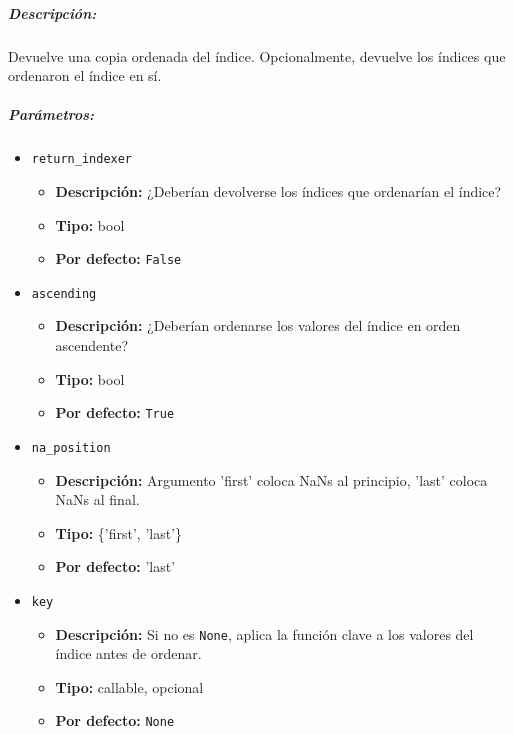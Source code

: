 \subparagraph{Descripción:}
Devuelve una copia ordenada del índice. Opcionalmente, devuelve los índices que
ordenaron el índice en sí.

\subparagraph{Parámetros:}

\begin{itemize}
    \item \texttt{return\_indexer}
          \begin{itemize}
              \item \textbf{Descripción:} ¿Deberían devolverse los índices que
                    ordenarían el índice?
              \item \textbf{Tipo:} bool
              \item \textbf{Por defecto:} \texttt{False}
          \end{itemize}
    \item \texttt{ascending}
          \begin{itemize}
              \item \textbf{Descripción:} ¿Deberían ordenarse los valores del
                    índice en orden ascendente?
              \item \textbf{Tipo:} bool
              \item \textbf{Por defecto:} \texttt{True}
          \end{itemize}
    \item \texttt{na\_position}
          \begin{itemize}
              \item \textbf{Descripción:} Argumento 'first' coloca NaNs al
                    principio, 'last' coloca NaNs al final.
              \item \textbf{Tipo:} \{'first', 'last'\}
              \item \textbf{Por defecto:} 'last'
          \end{itemize}
    \item \texttt{key}
          \begin{itemize}
              \item \textbf{Descripción:} Si no es \texttt{None}, aplica la
                    función clave a los valores del índice antes de ordenar.
              \item \textbf{Tipo:} callable, opcional
              \item \textbf{Por defecto:} \texttt{None}
          \end{itemize}
\end{itemize}

